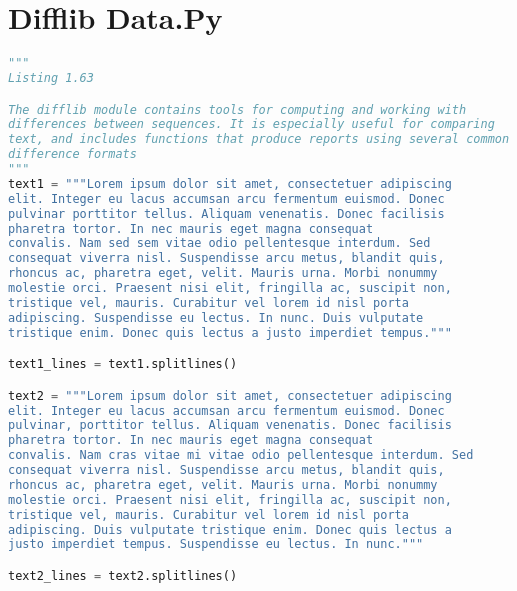 \documentclass[a4paper,landscape]{report}
\begin{document}
\section{Difflib Data.Py}
\begin{lstlisting}[language=Python]
"""
Listing 1.63

The difflib module contains tools for computing and working with
differences between sequences. It is especially useful for comparing
text, and includes functions that produce reports using several common
difference formats
"""
text1 = """Lorem ipsum dolor sit amet, consectetuer adipiscing
elit. Integer eu lacus accumsan arcu fermentum euismod. Donec
pulvinar porttitor tellus. Aliquam venenatis. Donec facilisis
pharetra tortor. In nec mauris eget magna consequat
convalis. Nam sed sem vitae odio pellentesque interdum. Sed
consequat viverra nisl. Suspendisse arcu metus, blandit quis,
rhoncus ac, pharetra eget, velit. Mauris urna. Morbi nonummy
molestie orci. Praesent nisi elit, fringilla ac, suscipit non,
tristique vel, mauris. Curabitur vel lorem id nisl porta
adipiscing. Suspendisse eu lectus. In nunc. Duis vulputate
tristique enim. Donec quis lectus a justo imperdiet tempus."""

text1_lines = text1.splitlines()

text2 = """Lorem ipsum dolor sit amet, consectetuer adipiscing
elit. Integer eu lacus accumsan arcu fermentum euismod. Donec
pulvinar, porttitor tellus. Aliquam venenatis. Donec facilisis
pharetra tortor. In nec mauris eget magna consequat
convalis. Nam cras vitae mi vitae odio pellentesque interdum. Sed
consequat viverra nisl. Suspendisse arcu metus, blandit quis,
rhoncus ac, pharetra eget, velit. Mauris urna. Morbi nonummy
molestie orci. Praesent nisi elit, fringilla ac, suscipit non,
tristique vel, mauris. Curabitur vel lorem id nisl porta
adipiscing. Duis vulputate tristique enim. Donec quis lectus a
justo imperdiet tempus. Suspendisse eu lectus. In nunc."""

text2_lines = text2.splitlines()

\end{lstlisting}
\end{document}
